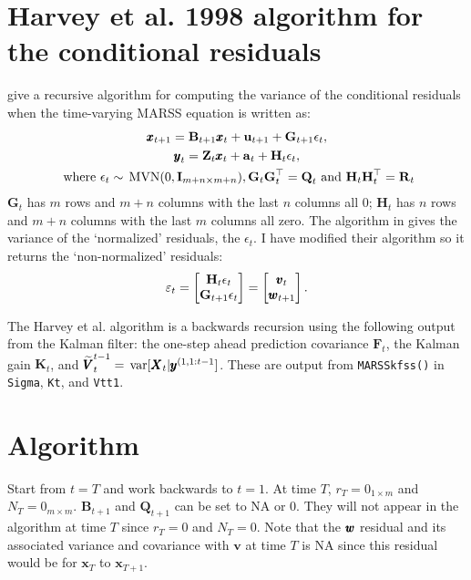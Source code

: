 \documentclass[]{article}
\def\UPS{\mbox{\boldmath $\Upsilon$}}
\def\XI{\mbox{\boldmath $\Xi$}}
\def\BB{\mbox{$\mathbf B$}}	\def\bb{\mbox{$\mathbf b$}} \def\Bb{\mbox{$\mathbf J$}} \def\Ba{\mbox{$\mathbf L$}} \def\Bm{\UPS}
\def\FF{\mbox{$\mathbf F$}} \def\ff{\mbox{$\mathbf f$}}
\def\GG{\mbox{$\mathbf G$}}	\def\gg{\mbox{$\mathbf g$}}
\def\HH{\mbox{$\mathbf H$}}	\def\hh{\mbox{$\mathbf h$}}
\def\II{\mbox{$\mathbf I$}} \def\ii{\mbox{$\mathbf i$}}
\def\KK{\mbox{$\mathbf K$}}
\def\MVN{\,\textup{\textrm{MVN}}}
\def\QQ{\mbox{$\mathbf Q$}}	 \def\qq{\mbox{$\mathbf q$}} \def\Qb{\mbox{$\mathbf G$}}  \def\Qm{\mathbb{Q}}
\def\RR{\mbox{$\mathbf R$}}	 \def\rr{\mbox{$\mathbf r$}} \def\Rb{\mbox{$\mathbf H$}}	\def\Rm{\mathbb{R}}
\def\VV{\mbox{$\pmb{V}$}}	\def\vv{\mbox{$\pmb{v}$}}
\def\XX{\mbox{$\pmb{X}$}}	\def\xx{\mbox{$\pmb{x}$}}
\def\ZZ{\mbox{$\mathbf Z$}}	\def\zz{\mbox{$\mathbf z$}}	\def\Zb{\mbox{$\mathbf M$}} \def\Za{\mbox{$\mathbf N$}} \def\Zm{\XI}
\def\var{\,\textup{\textrm{var}}}
\begin{document}
\section{Harvey et al. 1998 algorithm for the conditional residuals}
\citet[pgs 112-113]{Harveyetal1998} give a recursive algorithm for computing the variance of the conditional residuals when the time-varying MARSS equation is written as: 
\begin{equation}\label{eqn:residsMARSSHarvey}
\begin{gathered}
\xx_{t+1} = \BB_{t+1}\xx_t + \uu_{t+1} + \GG_{t+1}\epsilon_{t},\\
\yy_t = \ZZ_t\xx_t + \aa_t + \HH_t\epsilon_t,\\
\mbox{ where } \epsilon_t \sim \MVN(0,\II_{m+n \times m+n}), \GG_t\GG_t^\top=\QQ_t\text{ and }\HH_t\HH_t^\top=\RR_t
\end{gathered}
\end{equation}
$\GG_t$ has $m$  rows and $m+n$ columns with the last $n$ columns all 0; $\HH_t$ has $n$ rows and $m+n$ columns with the last $m$ columns all zero.  The algorithm in \citet{Harveyetal1998} gives the variance of the `normalized' residuals, the $\epsilon_t$.  I have modified their algorithm so it  returns the `non-normalized' residuals:
$$\varepsilon_t=\begin{bmatrix}\HH_t\epsilon_t\\ \GG_{t+1}\epsilon_t\end{bmatrix}=\begin{bmatrix}\vv_t\\ \ww_{t+1} \end{bmatrix}.$$

The Harvey et al. algorithm is a backwards recursion using the following output from the Kalman filter: the one-step ahead prediction covariance $\FF_t$, the Kalman gain $\KK_t$, and $\widetilde{\VV}_t^{t-1}=\var[\XX_t|\yy^{(1,1:{t-1}}]$. These are output from \texttt{MARSSkfss()} in \texttt{Sigma}, \texttt{Kt}, and \texttt{Vtt1}.

\section{Algorithm}

Start from $t=T$ and work backwards to $t=1$. At time $T$, $r_T=0_{1 \times m}$ and $N_T=0_{m \times m}$. $\BB_{t+1}$ and $\QQ_{t+1}$ can be set to NA or 0. They will not appear in the algorithm at time $T$ since $r_T=0$ and $N_T=0$. Note that the $\mbox{$\pmb{w}$}$ residual and its associated variance and covariance with $\vv$ at time $T$ is NA since this residual would be for $\xx_T$ to $\xx_{T+1}$.
\end{document}
